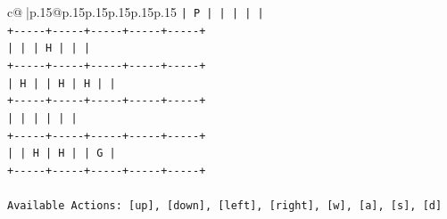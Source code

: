 \documentclass{article}
\begin{document}
{\begin{supertabular}{c@{$\;$}|p{.15\linewidth}@{}p{.15\linewidth}p{.15\linewidth}p{.15\linewidth}p{.15\linewidth}p{.15\linewidth}}
{{{\texttt{|  P  |     |     |     |     |} \\
\texttt{+{-}{-}{-}{-}{-}+{-}{-}{-}{-}{-}+{-}{-}{-}{-}{-}+{-}{-}{-}{-}{-}+{-}{-}{-}{-}{-}+} \\
\texttt{|     |     |  H  |     |     |} \\
\texttt{+{-}{-}{-}{-}{-}+{-}{-}{-}{-}{-}+{-}{-}{-}{-}{-}+{-}{-}{-}{-}{-}+{-}{-}{-}{-}{-}+} \\
\texttt{|  H  |     |  H  |  H  |     |} \\
\texttt{+{-}{-}{-}{-}{-}+{-}{-}{-}{-}{-}+{-}{-}{-}{-}{-}+{-}{-}{-}{-}{-}+{-}{-}{-}{-}{-}+} \\
\texttt{|     |     |     |     |     |} \\
\texttt{+{-}{-}{-}{-}{-}+{-}{-}{-}{-}{-}+{-}{-}{-}{-}{-}+{-}{-}{-}{-}{-}+{-}{-}{-}{-}{-}+} \\
\texttt{|     |  H  |  H  |     |  G  |} \\
\texttt{+{-}{-}{-}{-}{-}+{-}{-}{-}{-}{-}+{-}{-}{-}{-}{-}+{-}{-}{-}{-}{-}+{-}{-}{-}{-}{-}+} \\
\\ 
\texttt{Available Actions: {[}up{]}, {[}down{]}, {[}left{]}, {[}right{]}, {[}w{]}, {[}a{]}, {[}s{]}, {[}d{]}} \\
            }
        }
    }
     \\ \\


\end{supertabular}}
\end{document}

